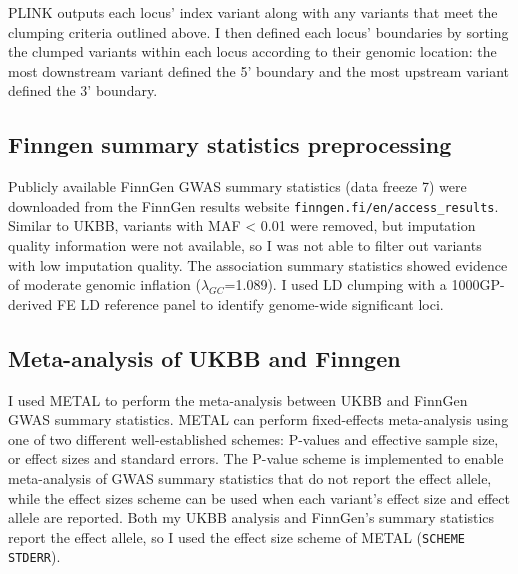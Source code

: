 PLINK outputs each locus' index variant along with any variants that meet the clumping criteria outlined above. I then defined each locus' boundaries by sorting the clumped variants within each locus according to their genomic location: the most downstream variant defined the 5' boundary and the most upstream variant defined the 3' boundary. 

\subsection{Finngen summary statistics preprocessing}
Publicly available FinnGen GWAS summary statistics (data freeze 7) were downloaded from the FinnGen results website \Verb+finngen.fi/en/access_results+. Similar to UKBB, variants with MAF < 0.01 were removed, but imputation quality information were not available, so I was not able to filter out variants with low imputation quality. The association summary statistics showed evidence of moderate genomic inflation ($\lambda_{GC}$=1.089). I used LD clumping with a 1000GP-derived FE LD reference panel to identify genome-wide significant loci. 

\subsection{Meta-analysis of UKBB and Finngen}
I used METAL to perform the meta-analysis between UKBB and FinnGen GWAS summary statistics.  METAL can perform fixed-effects meta-analysis using one of two different well-established schemes: P-values and effective sample size, or effect sizes and standard errors. The P-value scheme is implemented to enable meta-analysis of GWAS summary statistics that do not report the effect allele, while the effect sizes scheme can be used when each variant's effect size and effect allele are reported. Both my UKBB analysis and FinnGen's summary statistics report the effect allele, so I used the effect size scheme of METAL (\Verb+SCHEME STDERR+). \\



